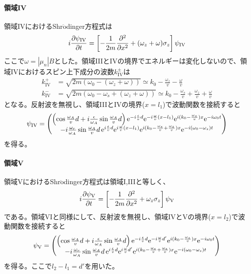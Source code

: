 \paragraph{領域IV}
領域IVにおけるShr$\ddot{\mathrm{o}}$dinger方程式は
\begin{equation}
i\frac{\partial \psi_\mathrm{IV}}{\partial t}= \left[-\frac{1}{2m} \frac{\partial^2}{\partial x^2} +(\omega_z+\omega) \sigma_z\right] \psi_\mathrm{IV}
\end{equation}
ここで$\omega=|\mu_n|B$とした。領域IIIとIVの境界でエネルギーは変化しないので、領域IVにおけるスピン上下成分の波数$k^\pm_\mathrm{IV}$は
\begin{align}
k^+_\mathrm{IV}&=\sqrt{2m(\omega_0-(\omega_z+\omega))}\simeq k_0 -\frac{\omega_z}{v}-\frac{\omega}{v} \\
k^-_\mathrm{IV}&=\sqrt{2m(\omega_0-\omega_s+(\omega_z+\omega))}\simeq k_0 -\frac{\omega_s}{v}+\frac{\omega_z}{v}+\frac{\omega}{v}
\end{align}
となる。反射波を無視し、領域IIIとIVの境界($x=l_1$)で波動関数を接続すると
\begin{equation}
\psi_\mathrm{IV}=\begin{pmatrix} \left(\cos \frac{\omega_A}{v}d +i\frac{\epsilon}{\omega_A} \sin \frac{\omega_A}{v}d\right) \mathrm{e}^{-i\frac{\epsilon}{v} d} \mathrm{e}^{-i\frac{\omega}{v} (x-l_1)} \mathrm{e}^{i(k_0-\frac{\omega_z}{v})x}\mathrm{e}^{-i\omega_0t} \\ -i \frac{\omega_r}{\omega_A} \sin \frac{\omega_A}{v}d  \, \mathrm{e}^{i\frac{\epsilon}{v}d} \mathrm{e}^{i\frac{\omega}{v}(x-l_1)} \mathrm{e}^{i(k_0-\frac{\omega_s}{v}+\frac{\omega_z}{v})x}\mathrm{e}^{-i(\omega_0-\omega_s)t} \end{pmatrix}
\end{equation}
を得る。

\paragraph{領域V}
領域VにおけるShr$\ddot{\mathrm{o}}$dinger方程式は領域I,IIIと等しく、
\begin{equation}
i\frac{\partial \psi_\mathrm{V}}{\partial t}= \left[-\frac{1}{2m} \frac{\partial^2}{\partial x^2} +\omega_z \sigma_z\right] \psi_\mathrm{V}
\end{equation}
である。領域VIと同様にして、反射波を無視し、領域IVとVの境界($x=l_2$)で波動関数を接続すると
\begin{equation}
\psi_\mathrm{V}=\begin{pmatrix} \left(\cos \frac{\omega_A}{v}d +i\frac{\epsilon}{\omega_A} \sin \frac{\omega_A}{v}d\right) \mathrm{e}^{-i\frac{\epsilon}{v} d} \mathrm{e}^{-i\frac{\omega}{v} d'} \mathrm{e}^{i(k_0-\frac{\omega_z}{v})x}\mathrm{e}^{-i\omega_0t} \\ -i \frac{\omega_r}{\omega_A} \sin \frac{\omega_A}{v}d  \, \mathrm{e}^{i\frac{\epsilon}{v}d} \mathrm{e}^{i\frac{\omega}{v} d'} \mathrm{e}^{i(k_0-\frac{\omega_s}{v}+\frac{\omega_z}{v})x}\mathrm{e}^{-i(\omega_0-\omega_s)t} \end{pmatrix} \label{Resonance_psi5}
\end{equation}
を得る。ここで$l_2-l_1=d'$を用いた。

